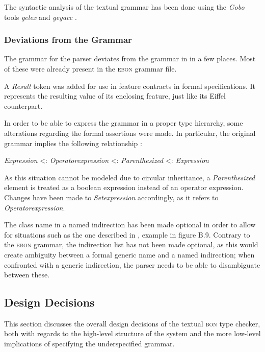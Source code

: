 The syntactic analysis of the textual \bon{} grammar has been done using the \textit{Gobo} tools \textit{gelex} and \textit{geyacc} \cite{gobo}.
\subsubsection{Deviations from the Grammar}
\label{design-grammar-deviations}
The grammar for the parser deviates from the grammar in \cite{walden1995} in a few places. Most of these were already present in the \textsc{ebon} grammar file.

A \textit{Result} token was added for use in feature contracts in formal specifications. It represents the resulting value of its enclosing feature, just like its Eiffel counterpart.

In order to be able to express the grammar in a proper type hierarchy, some alterations regarding the formal assertions were made. In particular, the original grammar implies the following relationship \cite[p.~357]{walden1995}:
\begin{center}
\textit{Expression} \textless : \textit{Operator\textunderscore expression} \textless : \textit{Parenthesized} \textless : \textit{Expression}
\end{center}
As this situation cannot be modeled due to circular inheritance, a \textit{Parenthesized} element is treated as a boolean expression instead of an operator expression. Changes have been made to \textit{Set\textunderscore expression} accordingly, as it refers to \textit{Operator\textunderscore expression}.

The class name in a named indirection has been made optional in order to allow for situations such as the one described in \cite[p.~372]{walden1995}, example in figure B.9. Contrary to the \textsc{ebon} grammar, the indirection list has not been made optional, as this would create ambiguity between a formal generic name and a named indirection; when confronted with a generic indirection, the parser needs to be able to disambiguate between these.

\subsection{Design Decisions}
This section discusses the overall design decisions of the textual \textsc{bon} type checker, both with regards to the high-level structure of the system and the more low-level implications of specifying the underspecified grammar.
